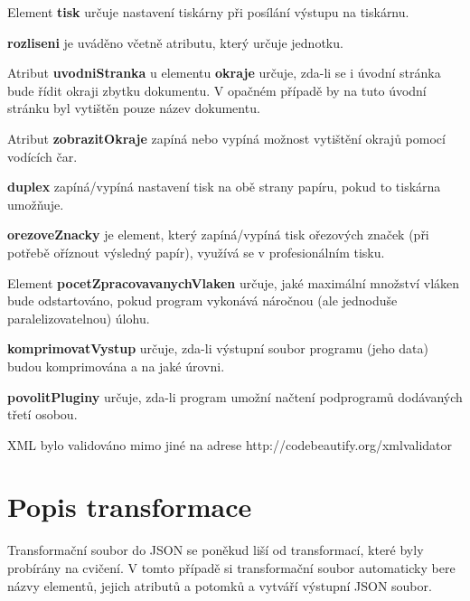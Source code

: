 \documentclass[czech]{article}
\begin{document}
Element \textquotedbl{}\textbf{tisk}\textquotedbl{} určuje nastavení
tiskárny při posílání výstupu na tiskárnu.

\textquotedbl{}\textbf{rozliseni}\textquotedbl{} je uváděno včetně
atributu, který určuje jednotku.

Atribut \textquotedbl{}\textbf{uvodniStranka}\textquotedbl{} u elementu
\textquotedbl{}\textbf{okraje}\textquotedbl{} určuje, zda-li se i
úvodní stránka bude řídit okraji zbytku dokumentu. V opačném případě
by na tuto úvodní stránku byl vytištěn pouze název dokumentu.

Atribut \textquotedbl{}\textbf{zobrazitOkraje}\textquotedbl{} zapíná
nebo vypíná možnost vytištění okrajů pomocí vodících čar.

\textquotedbl{}\textbf{duplex}\textquotedbl{} zapíná/vypíná nastavení
tisk na obě strany papíru, pokud to tiskárna umožňuje.

\textquotedbl{}\textbf{orezoveZnacky}\textquotedbl{} je element, který
zapíná/vypíná tisk ořezových značek (při potřebě oříznout výsledný
papír), využívá se v profesionálním tisku.

Element \textquotedbl{}\textbf{pocetZpracovavanychVlaken}\textquotedbl{}
určuje, jaké maximální množství vláken bude odstartováno, pokud program
vykonává náročnou (ale jednoduše paralelizovatelnou) úlohu.

\textquotedbl{}\textbf{komprimovatVystup}\textquotedbl{} určuje, zda-li
výstupní soubor programu (jeho data) budou komprimována a na jaké
úrovni.

\textquotedbl{}\textbf{povolitPluginy}\textquotedbl{} určuje, zda-li
program umožní načtení podprogramů dodávaných třetí osobou.

XML bylo validováno mimo jiné na adrese http://codebeautify.org/xmlvalidator


\section{Popis transformace}

Transformační soubor do JSON se poněkud liší od transformací, které
byly probírány na cvičení. V tomto případě si transformační soubor
automaticky bere názvy elementů, jejich atributů a potomků a vytváří
výstupní JSON soubor.

\begin{center}
\par\end{center}
\end{document}
